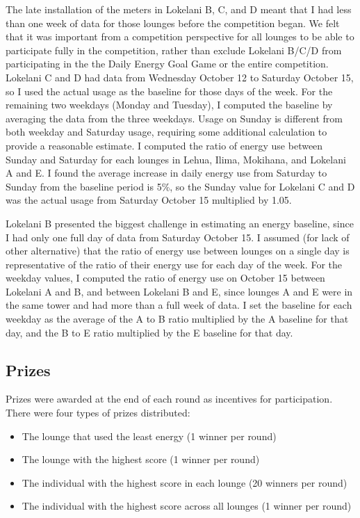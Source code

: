 The late installation of the meters in Lokelani B, C, and D meant that I had less than one week of data for those lounges before the competition began. We felt that it was important from a competition perspective for all lounges to be able to participate fully in the competition, rather than exclude Lokelani B/C/D from participating in the the Daily Energy Goal Game or the entire competition. Lokelani C and D had data from Wednesday October 12 to Saturday October 15, so I used the actual usage as the baseline for those days of the week. For the remaining two weekdays (Monday and Tuesday), I computed the baseline by averaging the data from the three weekdays. Usage on Sunday is different from both weekday and Saturday usage, requiring some additional calculation to provide a reasonable estimate. I computed the ratio of energy use between Sunday and Saturday for each lounges in Lehua, Ilima, Mokihana, and Lokelani A and E. I found the average increase in daily energy use from Saturday to Sunday from the baseline period is 5\%, so the Sunday value for Lokelani C and D was the actual usage from Saturday October 15 multiplied by 1.05.

Lokelani B presented the biggest challenge in estimating an energy baseline, since I had only one full day of data from Saturday October 15. I assumed (for lack of other alternative) that the ratio of energy use between lounges on a single day is representative of the ratio of their energy use for each day of the week. For the weekday values, I computed the ratio of energy use on October 15 between Lokelani A and B, and between Lokelani B and E, since lounges A and E were in the same tower and had more than a full week of data. I set the baseline for each weekday as the average of the A to B ratio multiplied by the A  baseline for that day, and the B to E ratio multiplied by the E baseline for that day.


\subsection{Prizes}
\label{sec:prizes}

Prizes were awarded at the end of each round as incentives for participation. There were four types of prizes distributed:

\begin{itemize}
	\item The lounge that used the least energy (1 winner per round)
	\item The lounge with the highest score (1 winner per round)
	\item The individual with the highest score in each lounge (20 winners per round)
	\item The individual with the highest score across all lounges (1 winner per round)
\end{itemize}

